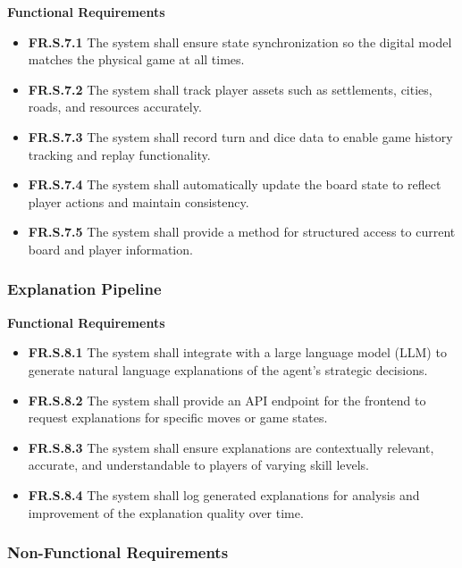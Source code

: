 \documentclass{article}
\begin{document}
\textbf{Functional Requirements}

\begin{itemize}
  \item \label{FR.S.7.1}\textbf{FR.S.7.1} The system shall ensure state synchronization so the digital model matches the physical game at all times.
  \item \label{FR.S.7.2}\textbf{FR.S.7.2} The system shall track player assets such as settlements, cities, roads, and resources accurately.
  \item \label{FR.S.7.3}\textbf{FR.S.7.3} The system shall record turn and dice data to enable game history tracking and replay functionality.
  \item \label{FR.S.7.4}\textbf{FR.S.7.4} The system shall automatically update the board state to reflect player actions and maintain consistency.
  \item \label{FR.S.7.5}\textbf{FR.S.7.5} The system shall provide a method for structured access to current board and player information.
\end{itemize}

\subsubsection{Explanation Pipeline}

\textbf{Functional Requirements}

\begin{itemize}
  \item \label{FR.S.8.1}\textbf{FR.S.8.1} The system shall integrate with a large language model (LLM) to generate natural language explanations of the \AI{} agent's strategic decisions.
  \item \label{FR.S.8.2}\textbf{FR.S.8.2} The system shall provide an API endpoint for the frontend to request explanations for specific moves or game states.
  \item \label{FR.S.8.3}\textbf{FR.S.8.3} The system shall ensure explanations are contextually relevant, accurate, and understandable to players of varying skill levels.
  \item \label{FR.S.8.4}\textbf{FR.S.8.4} The system shall log generated explanations for analysis and improvement of the explanation quality over time.
\end{itemize}

\subsubsection{Non-Functional Requirements}
\end{document}
